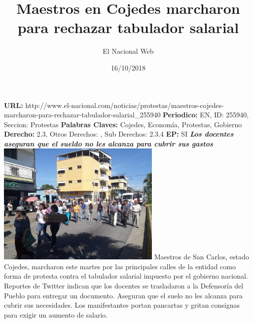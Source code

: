 \documentclass{article}%
\title{\textbf{Maestros en Cojedes marcharon para rechazar tabulador salarial}}%
\author{El Nacional Web}%
\date{16/10/2018}%
\begin{document}
%
\normalsize%
\maketitle%
\textbf{URL: }%
http://www.el{-}nacional.com/noticias/protestas/maestros{-}cojedes{-}marcharon{-}para{-}rechazar{-}tabulador{-}salarial\_255940\newline%
%
\textbf{Periodico: }%
EN, %
ID: %
255940, %
Seccion: %
Protestas\newline%
%
\textbf{Palabras Claves: }%
Cojedes, Economía, Protestas, Gobierno\newline%
%
\textbf{Derecho: }%
2.3, %
Otros Derechos: %
, %
Sub Derechos: %
2.3.4\newline%
%
\textbf{EP: }%
SI\newline%
\newline%
%
\textbf{\textit{Los docentes aseguran que el sueldo no les alcanza para cubrir sus gastos}}%
\newline%
\newline%
%
\includegraphics[width=300px]{80.jpg}%
\newline%
%
Maestros de San Carlos, estado Cojedes, marcharon este martes por las principales calles de la entidad como forma de protesta contra el tabulador salarial impuesto por el gobierno nacional.%
\newline%
%
Reportes de Twitter indican que los docentes se trasladaron a la Defensoría del Pueblo para entregar un documento. Aseguran que el suelo no les alcanza para cubrir sus necesidades.%
\newline%
%
Los manifestantes portan pancartas y gritan consignas para exigir un aumento de salario.%
\newline%
%
\end{document}
